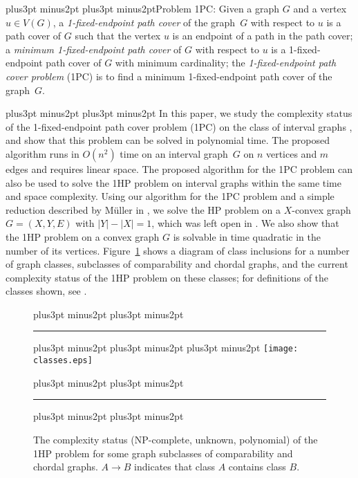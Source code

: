\documentclass[10pt]{article}
\def\yskip{\penalty-50\vskip3pt plus3pt minus2pt}
\def\y{\yskip}
\def\yy{\yskip\yskip}
\begin{document}
\yy\noindent Problem 1PC: Given a graph $G$ and a vertex $u \in
V(G)$, a {\it 1-fixed-endpoint path cover} of the graph~$G$ with
respect to $u$ is a path cover of $G$ such that the vertex $u$ is
an endpoint of a path in the path cover; a {\it minimum
1-fixed-endpoint path cover} of $G$ with respect to $u$ is a
1-fixed-endpoint path cover of $G$ with minimum cardinality; the
{\it 1-fixed-endpoint path cover problem} (1PC) is to find a
minimum 1-fixed-endpoint path cover of the graph~$G$.

\yy{} In this paper, we study the
complexity status of the 1-fixed-endpoint path cover problem (1PC)
on the class of interval graphs \cite{BraLeSpi, Gol}, and show
that this problem can be solved in polynomial time. The proposed
algorithm runs in $O(n^2)$ time on an interval graph~$G$ on $n$
vertices and $m$ edges and requires linear space. The proposed
algorithm for the 1PC problem can also be used to solve the 1HP
problem on interval graphs within the same time and space
complexity. Using our algorithm for the 1PC problem and a simple
reduction described by M\"{u}ller in \cite{Muller}, we solve the
HP problem on a $X$-convex graph $G=(X,Y,E)$ with $|Y|-|X|=1$,
which was left open in \cite{UeharaUno}. We also show that the 1HP
problem on a convex graph $G$ is solvable in time quadratic in the
number of its vertices. Figure~\ref{class} shows a diagram of
class inclusions for a number of graph classes, subclasses of
comparability and chordal graphs, and the current complexity
status of the 1HP problem on these classes; for definitions of the
classes shown, see \cite{BraLeSpi, Gol}.

\begin{figure}[t]
\yy \hrule \y\y\y
  \centering
  \texttt{[image: classes.eps]}
  \centering
  \caption{\small{The complexity status (NP-complete, unknown, polynomial) of the 1HP problem for some graph subclasses of comparability and chordal graphs. $A \rightarrow B$ indicates that
  class $A$ contains class $B$.}}
  \label{class}
 \yy \hrule \y\y
\end{figure}
\end{document}
